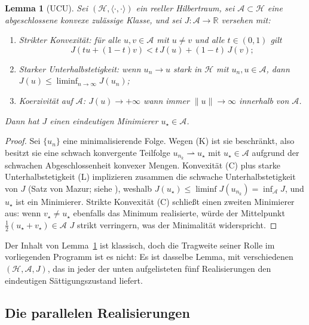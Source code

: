 \documentclass[11pt]{article}
\newtheorem{lemma}[theorem]{Lemma}
\theoremstyle{definition}
\theoremstyle{remark}
\begin{document}
\begin{lemma}[UCU]\label{lem:ucu}
Sei $(\mathcal{H}, \langle\cdot,\cdot\rangle)$ ein reeller Hilbertraum,
sei $\mathcal{A} \subset \mathcal{H}$ eine abgeschlossene konvexe zulässige Klasse,
und sei $J : \mathcal{A} \to \mathbb{R}$ versehen mit:
\begin{enumerate}
\item[(C)] \emph{Strikter Konvexität:} für alle $u,v \in \mathcal{A}$
mit $u \neq v$ und alle $t \in (0,1)$ gilt
\[
  J(tu + (1-t)v) < t\,J(u) + (1-t)\,J(v);
\]
\item[(L)] \emph{Starker Unterhalbstetigkeit:} wenn $u_n \to u$
stark in $\mathcal{H}$ mit $u_n, u \in \mathcal{A}$, dann
$J(u) \leq \liminf_{n\to\infty} J(u_n)$;
\item[(K)] \emph{Koerzivität auf $\mathcal{A}$:} $J(u) \to +\infty$
wann immer $\|u\| \to \infty$ innerhalb von $\mathcal{A}$.
\end{enumerate}
Dann hat $J$ einen eindeutigen Minimierer $u_\star \in \mathcal{A}$.
\end{lemma}

\begin{proof}
Sei $\{u_n\}$ eine minimalisierende Folge. Wegen (K) ist sie beschränkt, also
besitzt sie eine schwach konvergente Teilfolge $u_{n_k} \rightharpoonup u_\star$
mit $u_\star \in \mathcal{A}$ aufgrund der schwachen Abgeschlossenheit konvexer
Mengen. Konvexität (C) plus starke Unterhalbstetigkeit (L) implizieren zusammen
die schwache Unterhalbstetigkeit von $J$ (Satz von Mazur; siehe
\cite[Prop.~II.1.2]{EkelandTemam1999}), weshalb
$J(u_\star) \leq \liminf J(u_{n_k}) = \inf_{\mathcal{A}} J$, und
$u_\star$ ist ein Minimierer. Strikte Konvexität (C) schließt einen zweiten
Minimierer aus: wenn $v_\star \neq u_\star$ ebenfalls das Minimum realisierte,
würde der Mittelpunkt $\tfrac{1}{2}(u_\star + v_\star) \in \mathcal{A}$
$J$ strikt verringern, was der Minimalität widerspricht.
\end{proof}

Der Inhalt von Lemma~\ref{lem:ucu} ist klassisch, doch die Tragweite seiner
Rolle im vorliegenden Programm ist es nicht: Es ist dasselbe Lemma,
mit verschiedenen $(\mathcal{H}, \mathcal{A}, J)$, das in jeder der
unten aufgelisteten fünf Realisierungen den eindeutigen Sättigungszustand liefert.

\subsection{Die parallelen Realisierungen}
\label{sec:ucu-instances}
\end{document}
